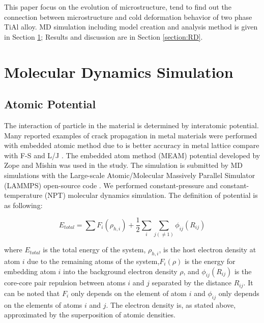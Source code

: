 \documentclass[metals,article,submit,moreauthors,pdftex,10pt,a4paper]{Definitions/mdpi}
\begin{document}
This paper focus on the evolution of microstructure, tend to find out the connection between microstructure and cold deformation behavior of two phase TiAl alloy. MD simulation including model creation and analysis method is given in Section \ref{section:method}; Results and discussion are in Section \ref{section:RD}.

\section{Molecular Dynamics Simulation }\label{section:method}
\subsection{Atomic Potential}

The interaction of particle in the material is determined by interatomic potential. Many reported examples of crack propagation in metal materials were performed with embedded atomic method due to is better accuracy in metal lattice compare with F-S and L/J \cite{Ko2015}. The embedded atom method (MEAM) potential developed by Zope and Mishin \cite{Zope2003} was used in the study. The simulation is submitted by MD simulations with the Large-scale Atomic/Molecular Massively Parallel Simulator (LAMMPS) open-source code \cite{Plimpton1995}. We performed constant-pressure and constant-temperature (NPT) molecular dynamics simulation. The definition of potential is as following:
	
\begin{equation} \label{eq:eam} 
E_{total}= \displaystyle\sum F_i(\rho_{h,i})+\frac{1}{2}\sum_i\sum_{j(\neq1)}\phi_{ij}(R_{ij})
\end{equation}
	
where $E_{total}$ is the total energy of the system, $\rho_{h,i}$, is the host electron density at atom $i$ due to the remaining atoms of the system,$F_i(\rho)$ is the energy for embedding atom $i$ into the background electron density $\rho$, and $\phi_{ij}(R_{ij})$ is the core-core pair repulsion between atoms $i$ and $j$ separated by the distance $R_{ij}$. It can be noted that $F_i$ only depends on the element of atom $i$ and $\phi_{ij}$ only depends on the elements of atoms $i$ and $j$. The electron density is, as stated above, approximated by the superposition of atomic densities.
	
%	
\end{document}
